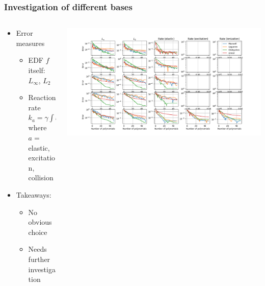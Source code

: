 \documentclass[mathserif, aspectratio=169]{beamer}
\newcommand{\ud}{\,\mathrm{d}}
\begin{document}
\begin{frame}
\frametitle{Investigation of different bases}
%
\begin{columns}[T]
\begin{column}{0.3\linewidth}
\begin{itemize}
\item Error measures
\begin{itemize}
\item EDF $f$ itself: $L_\infty$, $L_2$
\item Reaction rate
$k_a = \gamma \int \varepsilon \sigma_a f \ud \varepsilon$
where 
\\$a=$ elastic, excitation, collision
\end{itemize}
\item Takeaways:
\begin{itemize}
\item No obvious choice
\item Needs further investigation
\end{itemize}
\end{itemize}
\end{column}
\begin{column}{0.7\linewidth}
  \vspace{-0.35in}
  \begin{center}
   \includegraphics[width=\textwidth]{figures/bolsig_convergence.png}
  \end{center}
\end{column}
\end{columns}
%
\end{frame}


\end{document}
